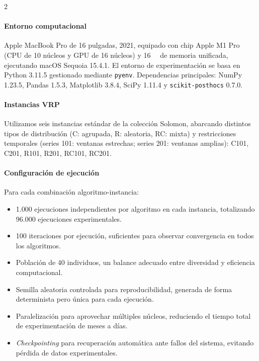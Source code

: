 \documentclass[10pt,a4paper]{extarticle}
\begin{document}
{\begin{multicols}{2}
\paragraph{Entorno computacional} Apple MacBook Pro de 16 pulgadas, 2021, equipado con chip Apple M1 Pro (CPU de 10 núcleos y GPU de 16 núcleos) y \SI{16}{\giga\byte} de memoria unificada, ejecutando macOS Sequoia 15.4.1. El entorno de experimentación se basa en Python 3.11.5 gestionado mediante \texttt{pyenv}. Dependencias principales: NumPy 1.23.5, Pandas 1.5.3, Matplotlib 3.8.4, SciPy 1.11.4 y \texttt{scikit-posthocs} 0.7.0.

\paragraph{Instancias VRP} Utilizamos seis instancias estándar de la colección Solomon, abarcando distintos tipos de distribución (C: agrupada, R: aleatoria, RC: mixta) y restricciones temporales (series 101: ventanas estrechas; series 201: ventanas amplias): C101, C201, R101, R201, RC101, RC201.

\paragraph{Configuración de ejecución} Para cada combinación algoritmo-instancia:
\begin{itemize}
\item 1.000 ejecuciones independientes por algoritmo en cada instancia, totalizando 96.000 ejecuciones experimentales.
\item 100 iteraciones por ejecución, suficientes para observar convergencia en todos los algoritmos.
\item Población de 40 individuos, un balance adecuado entre diversidad y eficiencia computacional.
\item Semilla aleatoria controlada para reproducibilidad, generada de forma determinista pero única para cada ejecución.
\item Paralelización para aprovechar múltiples núcleos, reduciendo el tiempo total de experimentación de meses a días.
\item \textit{Checkpointing} para recuperación automática ante fallos del sistema, evitando pérdida de datos experimentales.
\end{itemize}


\end{multicols}}
\end{document}

